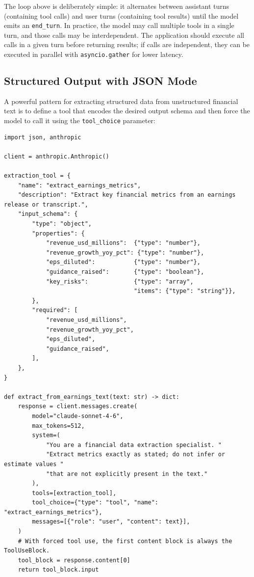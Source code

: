 The loop above is deliberately simple: it alternates between assistant turns
(containing tool calls) and user turns (containing tool results) until the model
emits an \texttt{end\_turn}. In practice, the model may call multiple tools in a
single turn, and those calls may be interdependent. The application should execute
all calls in a given turn before returning results; if calls are independent, they
can be executed in parallel with \texttt{asyncio.gather} for lower latency.

\subsection{Structured Output with JSON Mode}
\label{app:sdk-commercial:tools:json}

A powerful pattern for extracting structured data from unstructured financial text is
to define a tool that encodes the desired output schema and then force the model to call
it using the \texttt{tool\_choice} parameter:

\begin{verbatim}
import json, anthropic

client = anthropic.Anthropic()

extraction_tool = {
    "name": "extract_earnings_metrics",
    "description": "Extract key financial metrics from an earnings release or transcript.",
    "input_schema": {
        "type": "object",
        "properties": {
            "revenue_usd_millions":  {"type": "number"},
            "revenue_growth_yoy_pct": {"type": "number"},
            "eps_diluted":           {"type": "number"},
            "guidance_raised":       {"type": "boolean"},
            "key_risks":             {"type": "array",
                                     "items": {"type": "string"}},
        },
        "required": [
            "revenue_usd_millions",
            "revenue_growth_yoy_pct",
            "eps_diluted",
            "guidance_raised",
        ],
    },
}

def extract_from_earnings_text(text: str) -> dict:
    response = client.messages.create(
        model="claude-sonnet-4-6",
        max_tokens=512,
        system=(
            "You are a financial data extraction specialist. "
            "Extract metrics exactly as stated; do not infer or estimate values "
            "that are not explicitly present in the text."
        ),
        tools=[extraction_tool],
        tool_choice={"type": "tool", "name": "extract_earnings_metrics"},
        messages=[{"role": "user", "content": text}],
    )
    # With forced tool use, the first content block is always the ToolUseBlock.
    tool_block = response.content[0]
    return tool_block.input
\end{verbatim}

